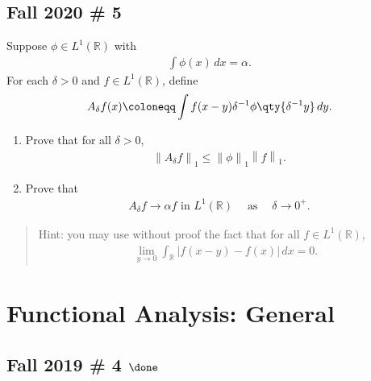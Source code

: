 \hypertarget{fall-2020-5}{%
\subsection{Fall 2020 \# 5}\label{fall-2020-5}}

Suppose \(\phi\in L^1({\mathbb{R}})\) with
\begin{align*}  
\int \phi(x) \, dx = \alpha
.\end{align*}
For each \(\delta > 0\) and \(f\in L^1({\mathbb{R}})\), define
\begin{align*}  
A_\delta f(x) \coloneqq\int f(x-y) \delta^{-1} \phi\qty{\delta^{-1} y}\, dy
.\end{align*}

\begin{enumerate}
\def\labelenumi{\alph{enumi}.}
\item
  Prove that for all \(\delta > 0\),
  \begin{align*}  
  {\left\lVert {A_\delta f} \right\rVert}_1 \leq {\left\lVert {\phi} \right\rVert}_1 {\left\lVert {f} \right\rVert}_1
  .\end{align*}
\item
  Prove that
  \begin{align*}  
  A_\delta f \to \alpha f \text{ in } L^1({\mathbb{R}}) {\quad \operatorname{as} \quad} \delta\to 0^+
  .\end{align*}
\end{enumerate}

\begin{quote}
Hint: you may use without proof the fact that for all
\(f\in L^1({\mathbb{R}})\),
\begin{align*}  
\lim_{y\to 0} \int_{\mathbb{R}}{\left\lvert {f(x-y) - f(x)} \right\rvert}\, dx = 0
.\end{align*}
\end{quote}

\hypertarget{functional-analysis-general}{%
\section{Functional Analysis:
General}\label{functional-analysis-general}}

\hypertarget{fall-2019-4-done}{%
\subsection{\texorpdfstring{Fall 2019 \# 4
\(\done\)}{Fall 2019 \# 4 \textbackslash done}}\label{fall-2019-4-done}}

